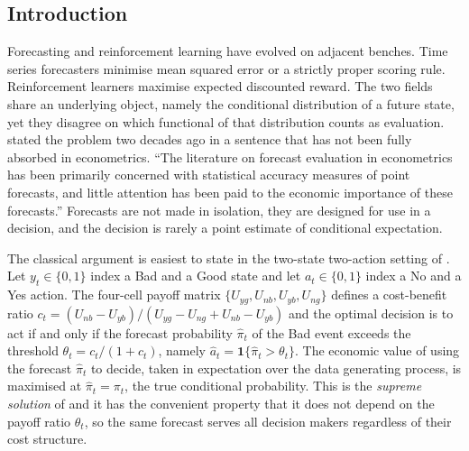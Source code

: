 \subsection{Introduction}
\label{sec:forecasting_rl_intro}

Forecasting and reinforcement learning have evolved on adjacent benches. Time series
forecasters minimise mean squared error or a strictly proper scoring rule.
Reinforcement learners maximise expected discounted reward. The two fields share an
underlying object, namely the conditional distribution of a future state, yet they
disagree on which functional of that distribution counts as evaluation.
\citet{GrangerPesaran2000} stated the problem two decades ago in a sentence that has
not been fully absorbed in econometrics. ``The literature on forecast evaluation in
econometrics has been primarily concerned with statistical accuracy measures of point
forecasts, and little attention has been paid to the economic importance of these
forecasts.'' Forecasts are not made in isolation, they are designed for use in a
decision, and the decision is rarely a point estimate of conditional expectation.

The classical argument is easiest to state in the two-state two-action setting of
\citet{GrangerPesaran2000}. Let $y_t \in \{0, 1\}$ index a Bad and a Good state and
let $a_t \in \{0, 1\}$ index a No and a Yes action. The four-cell payoff matrix
$\{U_{yg}, U_{nb}, U_{yb}, U_{ng}\}$ defines a cost-benefit ratio
$c_t = (U_{nb} - U_{yb}) / (U_{yg} - U_{ng} + U_{nb} - U_{yb})$ and the optimal
decision is to act if and only if the forecast probability $\hat\pi_t$ of the Bad
event exceeds the threshold $\theta_t = c_t / (1 + c_t)$, namely
$\hat a_t = \mathbf 1\{\hat\pi_t > \theta_t\}$. The economic value of using the
forecast $\hat\pi_t$ to decide, taken in expectation over the data generating process,
is maximised at $\hat\pi_t = \pi_t$, the true conditional probability. This is the
\emph{supreme solution} of \citet{GrangerPesaran2000} and it has the convenient
property that it does not depend on the payoff ratio $\theta_t$, so the same forecast
serves all decision makers regardless of their cost structure.

